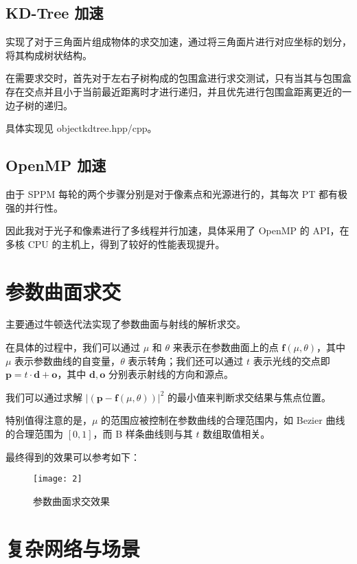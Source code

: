 \documentclass[a4paper]{article}
\begin{document}
    \subsection{KD-Tree 加速}
    实现了对于三角面片组成物体的求交加速，通过将三角面片进行对应坐标的划分，将其构成树状结构。
    
    在需要求交时，首先对于左右子树构成的包围盒进行求交测试，只有当其与包围盒存在交点并且小于当前最近距离时才进行递归，并且优先进行包围盒距离更近的一边子树的递归。

    具体实现见 objectkdtree.hpp/cpp。

    \subsection{OpenMP 加速}

    由于 SPPM 每轮的两个步骤分别是对于像素点和光源进行的，其每次 PT 都有极强的并行性。

    因此我对于光子和像素进行了多线程并行加速，具体采用了 OpenMP 的 API，在多核 CPU 的主机上，得到了较好的性能表现提升。

    \newpage
    \section{参数曲面求交}

    主要通过牛顿迭代法实现了参数曲面与射线的解析求交。

    在具体的过程中，我们可以通过 $\mu$ 和 $\theta$ 来表示在参数曲面上的点 $\pmb{f}(\mu, \theta)$，其中 $\mu$ 表示参数曲线的自变量，$\theta$ 表示转角；我们还可以通过 $t$ 表示光线的交点即 $\pmb{p} = t \cdot \pmb{d} + \pmb{o}$，其中 $\pmb{d}, \pmb{o}$ 分别表示射线的方向和源点。

    我们可以通过求解 $|(\pmb{p} - \pmb{f}(\mu, \theta))|^2$ 的最小值来判断求交结果与焦点位置。

    特别值得注意的是，$\mu$ 的范围应被控制在参数曲线的合理范围内，如 Bezier 曲线的合理范围为 $[0, 1]$，而 B 样条曲线则与其 $t$ 数组取值相关。

    最终得到的效果可以参考如下：

    \begin{figure}[h]
        \centering
        \texttt{[image: 2]}
        \caption{参数曲面求交效果}
        \label{fig2}
    \end{figure}

    \newpage
    \section{复杂网络与场景}
\end{document}

